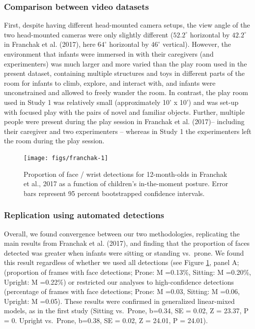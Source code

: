 \documentclass[english,man]{apa6}
\begin{document}
\subsubsection{Comparison between video
datasets}\label{comparison-between-video-datasets}

First, despite having different head-mounted camera setups, the view
angle of the two head-mounted cameras were only slightly different
(\(52.2^{\circ}\) horizontal by \(42.2^{\circ}\) in Franchak et al.
(2017), here \(64^{\circ}\) horizontal by \(46^{\circ}\) vertical).
However, the environment that infants were immersed in with their
caregivers (and experimenters) was much larger and more varied than the
play room used in the present dataset, containing multiple structures
and toys in different parts of the room for infants to climb, explore,
and interact with, and infants were unconstrained and allowed to freely
wander the room. In contrast, the play room used in Study 1 was
relatively small (approximately 10' x 10') and was set-up with focused
play with the pairs of novel and familiar objects. Further, multiple
people were present during the play session in Franchak et al. (2017)--
including their caregiver and two experimenters -- whereas in Study 1
the experimenters left the room during the play session.

\begin{figure}[H]

{\centering \texttt{[image: figs/franchak-1]} 

}

\caption{Proportion of face / wrist detections for 12-month-olds in Franchak et al., 2017 as a function of children's in-the-moment posture. Error bars represent 95 percent bootstrapped confidence intervals.}\label{fig:franchak}
\end{figure}

\subsubsection{Replication using automated
detections}\label{replication-using-automated-detections}

Overall, we found convergence between our two methodologies, replicating
the main results from Franchak et al. (2017), and finding that the
proportion of faces detected was greater when infants were sitting or
standing vs.~prone. We found this result regardless of whether we used
all detections (see Figure \ref{fig:franchak}, panel A; (proportion of
frames with face detections; Prone: M =0.13\%, Sitting: M =0.20\%,
Upright: M =0.22\%) or restricted our analyses to high-confidence
detections (percentage of frames with face detections; Prone: M =0.03,
Sitting: M =0.06, Upright: M =0.05). These results were confirmed in
generalized linear-mixed models, as in the first study (Sitting
vs.~Prone, b=0.34, SE = 0.02, Z = 23.37, P = 0. Upright vs.~Prone,
b=0.38, SE = 0.02, Z = 24.01, P = 24.01).
\end{document}
